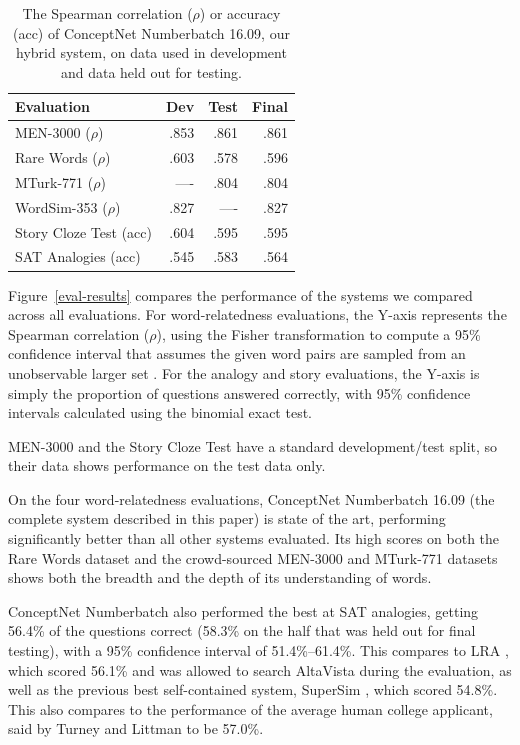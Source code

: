 \documentclass[letterpaper]{article}
\begin{document}
\begin{table}[t]
\centering
\begin{tabular}{lrrr}
\bf Evaluation     & \bf Dev & \bf Test & \bf Final \\
\hline
MEN-3000 ($\rho$)              & .853 & .861 & .861 \\
Rare Words ($\rho$)            & .603 & .578 & .596 \\
MTurk-771 ($\rho$)             & ---- & .804 & .804 \\
WordSim-353 ($\rho$)           & .827 & ---- & .827 \\
Story Cloze Test (acc)         & .604 & .595 & .595 \\
SAT Analogies (acc)            & .545 & .583 & .564
\end{tabular}
\caption{The Spearman correlation ($\rho$) or accuracy (acc) of ConceptNet Numberbatch 16.09, our hybrid system,
on data used in development and data held out for testing.}
\end{table}

Figure~\ref{eval-results} compares the performance of the systems we compared
across all evaluations. For word-relatedness evaluations, the Y-axis represents
the Spearman correlation ($\rho$), using the Fisher transformation to compute a
95\% confidence interval that assumes the given word pairs are sampled from an
unobservable larger set \cite{bonett2000sample}. For the analogy and story evaluations,
the Y-axis is simply the proportion of questions answered correctly, with 95\%
confidence intervals calculated using the binomial exact test.

MEN-3000 and the Story Cloze Test have a standard development/test split, so
their data shows performance on the test data only.

On the four word-relatedness evaluations, ConceptNet Numberbatch 16.09 (the
complete system described in this paper) is state of the art, performing
significantly better than all other systems evaluated. Its high scores on both
the Rare Words dataset and the crowd-sourced MEN-3000 and MTurk-771 datasets
shows both the breadth and the depth of its understanding of words.

ConceptNet Numberbatch also performed the best at SAT analogies, getting 56.4\%
of the questions correct (58.3\% on the half that was held out for final
testing), with a 95\% confidence interval of 51.4\%--61.4\%.
This compares to LRA \cite{turney2005lra}, which scored 56.1\% and was
allowed to search AltaVista during the evaluation, as well as the previous best
self-contained system, SuperSim \cite{turney2013supersim}, which scored 54.8\%.
This also compares to the performance of the average human college applicant,
said by Turney and Littman to be 57.0\%.
\end{document}
